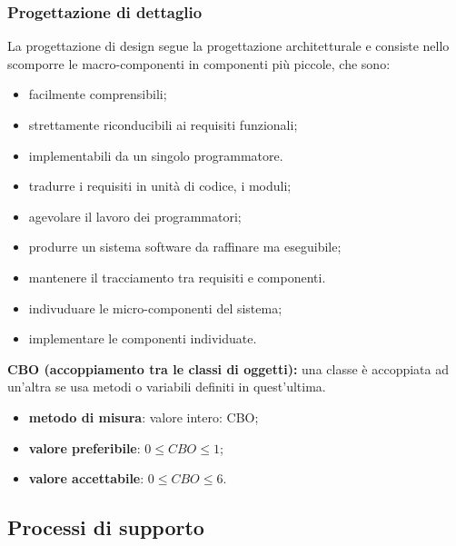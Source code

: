 \subsubsection{Progettazione di dettaglio}
La progettazione di design segue la progettazione architetturale e consiste nello scomporre le macro-componenti in componenti 
più piccole, che sono:
\begin{itemize}
    \item facilmente comprensibili;
    \item strettamente riconducibili ai requisiti funzionali;
    \item implementabili da un singolo programmatore.
\end{itemize}
\begin{itemize}
    \item tradurre i requisiti in unità di codice, i moduli;
    \item agevolare il lavoro dei programmatori;
    \item produrre un sistema software da raffinare ma eseguibile;
    \item mantenere il tracciamento tra requisiti e componenti.
\end{itemize}
\begin{itemize}
    \item indivuduare le micro-componenti del sistema;
    \item implementare le componenti individuate.
\end{itemize}
\textbf{CBO (accoppiamento tra le classi di oggetti):} una classe è accoppiata ad un'altra se usa metodi o variabili definiti in quest'ultima.
\begin{itemize}
    \item \textbf{metodo di misura}: valore intero: CBO;
    \item \textbf{valore preferibile}: $0 \leq CBO \leq 1$;
    \item \textbf{valore accettabile}: $0 \leq CBO \leq 6$.
\end{itemize}
\subsection{Processi di supporto}
